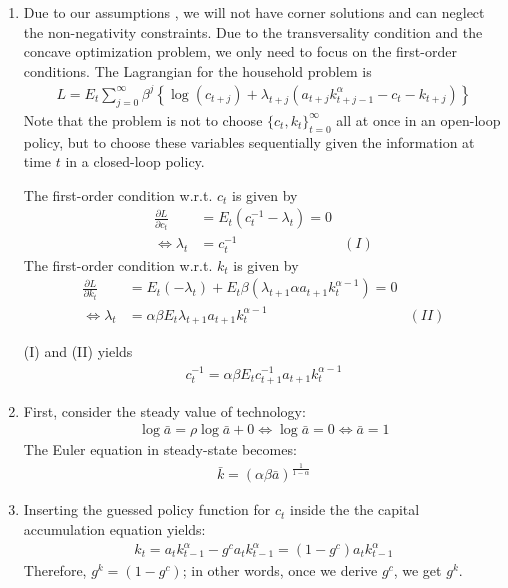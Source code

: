 \begin{enumerate}

\item Due to our assumptions , we will not have corner solutions and can neglect the non-negativity constraints.
Due to the transversality condition and the concave optimization problem, we only need to focus on the first-order conditions. 
The Lagrangian for the household problem is
\begin{align*}
L = E_t\sum_{j=0}^{\infty}\beta^j\left\{\log(c_{t+j}) + \lambda_{t+j} \left(a_{t+j}k_{t+j-1}^\alpha - c_t - k_{t+j}\right)\right\}
\end{align*}
Note that the problem is not to choose $\{c_t,k_{t}\}_{t=0}^\infty$ all at once in an open-loop policy,
  but to choose these variables sequentially given the information at time $t$ in a closed-loop policy.

The first-order condition w.r.t. $c_t$ is given by
\begin{align*}
\frac{\partial L}{\partial c_{t}} &= E_t \left(c_t^{-1}-\lambda_{t}\right) = 0
\\
\Leftrightarrow \lambda_{t} &= c_{t}^{-1} & (I)
\end{align*}
The first-order condition w.r.t. $k_{t}$ is given by
\begin{align*}
\frac{\partial L}{\partial k_{t}} &= E_t (-\lambda_{t}) + E_t \beta \left(\lambda_{t+1}\alpha a_{t+1} k_{t}^{\alpha-1}\right) = 0
\\
\Leftrightarrow \lambda_{t} &= \alpha\beta E_t \lambda_{t+1} a_{t+1} k_{t}^{\alpha-1} & (II)
\end{align*}
			
(I) and (II) yields
\begin{align*}
c_t^{-1} = \alpha \beta E_t c_{t+1}^{-1} a_{t+1} k_{t}^{\alpha-1}
\end{align*}
	
\item First, consider the steady value of technology: 
\begin{align*}
\log\bar{a}=\rho \log\bar{a} + 0 \Leftrightarrow \log\bar{a} = 0 \Leftrightarrow \bar{a} = 1
\end{align*}
The Euler equation in steady-state becomes:
\begin{align*}
\bar{k} = (\alpha \beta \bar{a})^{\frac{1}{1-\alpha}}
\end{align*}
	
\item Inserting the guessed policy function for $c_t$ inside the the capital accumulation equation yields:
\begin{align*}
k_{t} = a_{t} k_{t-1}^\alpha - g^c a_t k_{t-1}^\alpha = (1-g^c) a_t k_{t-1}^\alpha
\end{align*}
Therefore, $g^k=(1-g^c)$; in other words, once we derive $g^c$, we get $g^k$.
			

\end{enumerate}
